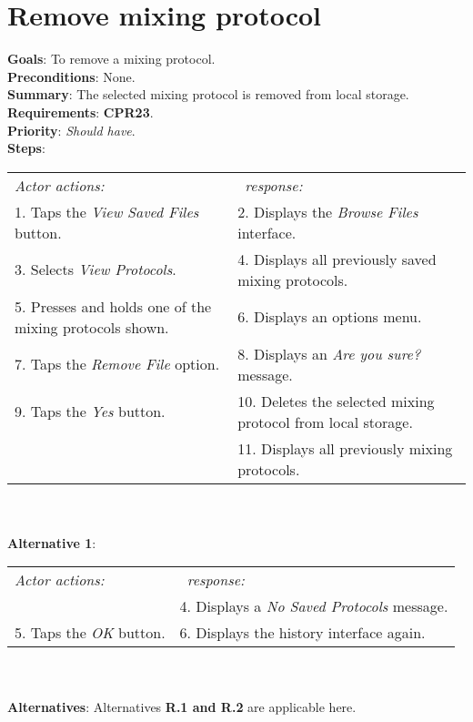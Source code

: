\section{Remove mixing protocol}
 \label{removedist}
  \textbf{Goals}: To remove a mixing protocol.\\
  \textbf{Preconditions}: None.\\
  \textbf{Summary}: The selected mixing protocol is removed from local storage.\\
  \textbf{Requirements}: \textbf{CPR23}.\\
  \textbf{Priority}: \emph{Should have}.\\
  \textbf{Steps}: \\
    \begin{tabular}{ p{} p{} }
  	\emph{Actor actions:} & \emph{\projectname\ response:} \\
    1. Taps the \emph{View Saved Files} button. & 2. Displays the \emph{Browse Files} interface.\\
    3. Selects \emph{View Protocols}. & 4. Displays all previously saved mixing protocols.\\
    5. Presses and holds one of the mixing protocols shown. & 6. Displays an options menu. \\
    7. Taps the \emph{Remove File} option. & 8. Displays an \emph{Are you sure?} message.\\
    9. Taps the \emph{Yes} button. & 10. Deletes the selected mixing protocol from local storage. \\
     & 11. Displays all previously mixing protocols.\\
    \end{tabular}
                \\
     \\\textbf{Alternative 1}: \\
    \begin{tabular}{ p{} p{} }
  	\emph{Actor actions:} & \emph{\projectname\ response:} \\
            & 4. Displays a \emph{No Saved Protocols} message. \\
    5. Taps the \emph{OK} button. & 6. Displays the history interface again. \\
    \end{tabular}
    \\
    \\\textbf{Alternatives}: Alternatives \textbf{R.1 and R.2} are applicable here.
    
